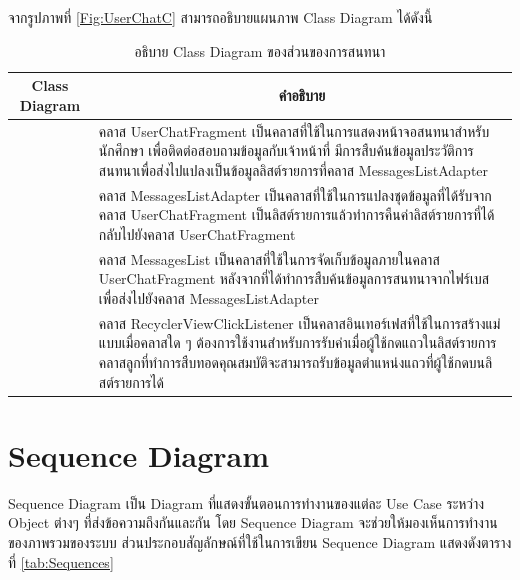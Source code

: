 จากรูปภาพที่ \ref{Fig:UserChatC} สามารถอธิบายแผนภาพ Class Diagram ได้ดังนี้
\begin{table}[H]
	\centering
	\caption{อธิบาย Class Diagram ของส่วนของการสนทนา}
	\label{tab:class}
	\begin{tabular}{|c|p{10cm}|}
		\hline
		\textbf{Class Diagram} & \multicolumn{1}{c|}{\textbf{คำอธิบาย}} \\ \hline
		\raisebox{-\totalheight}{UserChatFragment}
		& \setstretch{1.5} {คลาส UserChatFragment เป็นคลาสที่ใช้ในการแสดงหน้าจอสนทนาสำหรับนักศึกษา เพื่อติดต่อสอบถามข้อมูลกับเจ้าหน้าที่ มีการสืบค้นข้อมูลประวัติการสนทนาเพื่อส่งไปแปลงเป็นข้อมูลลิสต์รายการที่คลาส MessagesListAdapter} \\ \hline
		\raisebox{-\totalheight}{MessagesListAdapter}
		& \setstretch{1.5} {คลาส MessagesListAdapter เป็นคลาสที่ใช้ในการแปลงชุดข้อมูลที่ได้รับจากคลาส UserChatFragment เป็นลิสต์รายการแล้วทำการคืนค่าลิสต์รายการที่ได้กลับไปยังคลาส UserChatFragment} \\ \hline 
		\raisebox{-\totalheight}{MessagesList}
		& \setstretch{1.5} {คลาส MessagesList เป็นคลาสที่ใช้ในการจัดเก็บข้อมูลภายในคลาส UserChatFragment หลังจากที่ได้ทำการสืบค้นข้อมูลการสนทนาจากไฟร์เบสเพื่อส่งไปยังคลาส MessagesListAdapter} \\ \hline
		\raisebox{-\totalheight}{RecyclerViewClickListener}
		& \setstretch{1.5} {คลาส RecyclerViewClickListener เป็นคลาสอินเทอร์เฟสที่ใช้ในการสร้างแม่แบบเมื่อคลาสใด ๆ ต้องการใช้งานสำหรับการรับค่าเมื่อผู้ใช้กดแถวในลิสต์รายการ คลาสลูกที่ทำการสืบทอดคุณสมบัติจะสามารถรับข้อมูลตำแหน่งแถวที่ผู้ใช้กดบนลิสต์รายการได้} \\ \hline
	\end{tabular}
\end{table}

\newpage
\section{Sequence Diagram}
	Sequence Diagram เป็น Diagram ที่แสดงขั้นตอนการทำงานของแต่ละ Use Case ระหว่าง Object ต่างๆ ที่ส่งข้อความถึงกันและกัน โดย Sequence Diagram จะช่วยให้มองเห็นการทำงานของภาพรวมของระบบ ส่วนประกอบสัญลักษณ์ที่ใช้ในการเขียน Sequence Diagram 
	แสดงดังตารางที่ \ref{tab:Sequences}
	
